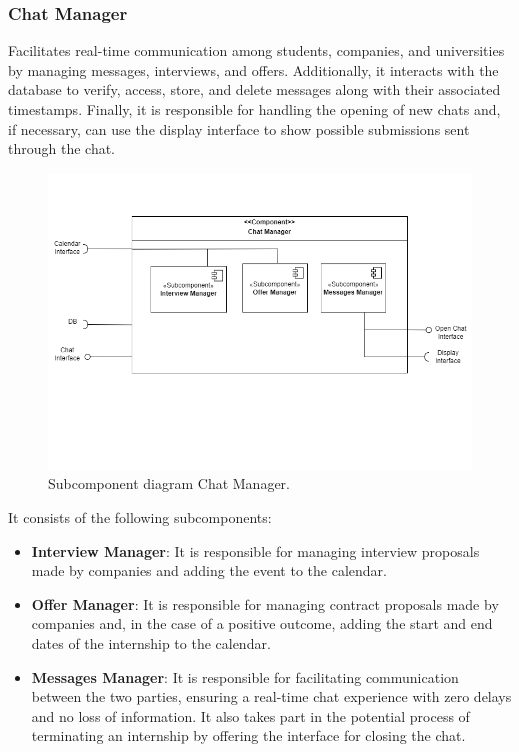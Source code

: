 \clearpage %
\subsubsection{Chat Manager} Facilitates real-time communication among students, companies, and universities by managing messages, interviews, and offers. Additionally, it interacts with the database to verify, access, store, and delete messages along with their associated timestamps. Finally, it is responsible for handling the opening of new chats and, if necessary, can use the display interface to show possible submissions sent through the chat.
\begin{figure}[H]
    \centering
    \includegraphics[width=0.8\linewidth]{DD/Images/Comp&Sub/ChatManager.png}
    \caption{Subcomponent diagram Chat Manager.}
    \label{fig:chat_manager}
    \end{figure}
    
It consists of the following subcomponents:
\begin{itemize}
    \item  \textbf{Interview Manager}: It is responsible for managing interview proposals made by companies and adding the event to the calendar.
    \item  \textbf{Offer Manager}: It is responsible for managing contract proposals made by companies and, in the case of a positive outcome, adding the start and end dates of the internship to the calendar.
    \item  \textbf{Messages Manager}: It is responsible for facilitating communication between the two parties, ensuring a real-time chat experience with zero delays and no loss of information.
    It also takes part in the potential process of terminating an internship by offering the interface for closing the chat.
    \end{itemize}

